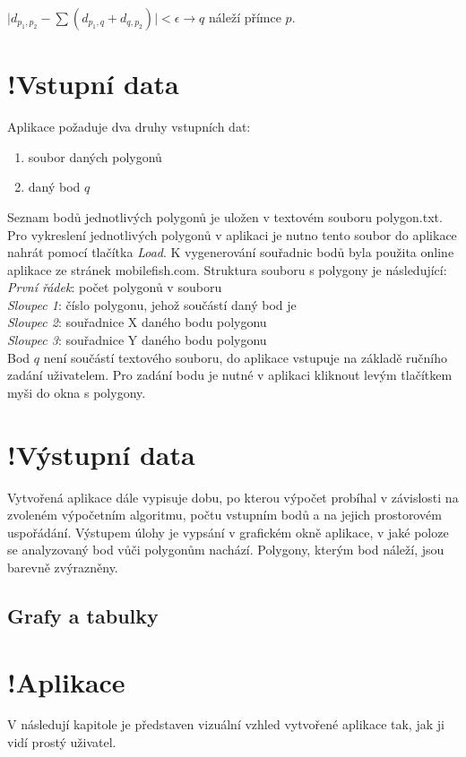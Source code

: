 \documentclass[a4paper, 12pt]{article}
\begin{document}
$\mid d_{p_1,p_2} - \sum(d_{p_1,q} + d_{q,p_2}) \mid  < \epsilon \rightarrow q$ náleží přímce $p$.

\section{!Vstupní data}
Aplikace požaduje dva druhy vstupních dat:

\begin{enumerate}
\item soubor daných polygonů
\item daný bod $q$
\end{enumerate}

Seznam bodů jednotlivých polygonů je uložen v textovém souboru polygon.txt. Pro vykreslení jednotlivých polygonů v aplikaci je nutno tento soubor do aplikace nahrát pomocí tlačítka \textit{Load}. K vygenerování souřadnic bodů byla použita online aplikace ze stránek mobilefish.com. Struktura souboru s polygony je následující:\\

\noindent
\textsl{První řádek}: počet polygonů v souboru\\
\textsl{Sloupec 1}: číslo polygonu, jehož součástí daný bod je\\
\textsl{Sloupec 2}: souřadnice X daného bodu polygonu\\
\textsl{Sloupec 3}: souřadnice Y daného bodu polygonu\\

Bod $q$ není součástí textového souboru, do aplikace vstupuje na základě ručního zadání uživatelem. Pro zadání bodu je nutné v aplikaci kliknout levým tlačítkem myši do okna s polygony.

\section{!Výstupní data}
Vytvořená aplikace dále vypisuje dobu, po kterou  výpočet probíhal v závislosti na zvoleném výpočetním algoritmu, počtu vstupním bodů a na jejich prostorovém uspořádání.
Výstupem úlohy je vypsání v grafickém okně aplikace, v jaké poloze se analyzovaný bod vůči polygonům nachází. Polygony, kterým bod náleží, jsou barevně zvýrazněny.

\subsection{Grafy a tabulky}

\clearpage
\section{!Aplikace}
V následují kapitole je představen vizuální vzhled vytvořené aplikace tak, jak ji vidí prostý uživatel.
\end{document}
